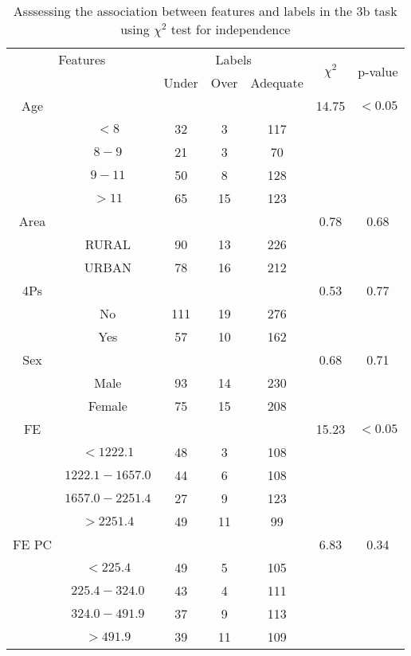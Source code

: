 \begin{table}[!htb]
\centering
\caption{Asssessing the association between features and labels in the 3b task using $\chi^2$ test for independence}
\label{tab:chitest_3b}
\begin{tabular}{c c | c c c| c | c}
\hline
\multicolumn{2}{c|}{Features}& \multicolumn{3}{c|}{Labels}& \multirow{2}{*}{$\chi^2$} & \multirow{2}{*}{p-value}\\ 
& & Under & Over & Adequate & & \\ 
\hline
Age &  &  &  & & 14.75 & $< 0.05$ \\ 
& $< 8$ & 32 & 3 & 117& & \\ 
& $8-9$ & 21 & 3 & 70& & \\ 
& $9-11$ & 50 & 8 & 128& & \\ 
& $> 11$ & 65 & 15 & 123& & \\ 
\hline 
Area &  &  &  & & 0.78 & 0.68 \\ 
& RURAL & 90 & 13 & 226& & \\ 
& URBAN & 78 & 16 & 212& & \\ 
\hline 
4Ps &  &  &  & & 0.53 & 0.77 \\ 
& No & 111 & 19 & 276& & \\ 
& Yes & 57 & 10 & 162& & \\ 
\hline 
Sex &  &  &  & & 0.68 & 0.71 \\ 
& Male & 93 & 14 & 230& & \\ 
& Female & 75 & 15 & 208& & \\ 
\hline 
FE &  &  &  & & 15.23 & $< 0.05$ \\ 
& $< 1222.1$ & 48 & 3 & 108& & \\ 
& $1222.1-1657.0$ & 44 & 6 & 108& & \\ 
& $1657.0-2251.4$ & 27 & 9 & 123& & \\ 
& $> 2251.4$ & 49 & 11 & 99& & \\ 
\hline 
FE PC &  &  &  & & 6.83 & 0.34 \\ 
& $< 225.4$ & 49 & 5 & 105& & \\ 
& $225.4-324.0$ & 43 & 4 & 111& & \\ 
& $324.0-491.9$ & 37 & 9 & 113& & \\ 
& $> 491.9$ & 39 & 11 & 109& & \\ 
\hline 
\end{tabular}
\end{table}

